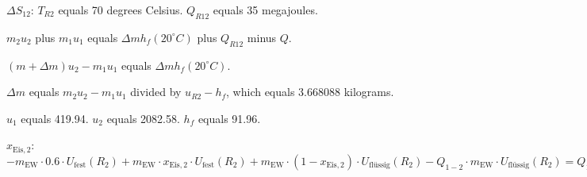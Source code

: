 \( \Delta S_{12} \): \( T_{R2} \) equals 70 degrees Celsius. \( Q_{R12} \) equals 35 megajoules.

\( m_2 u_2 \) plus \( m_1 u_1 \) equals \( \Delta m h_f (20^\circ C) \) plus \( Q_{R12} \) minus \( Q \).

\( (m + \Delta m) u_2 - m_1 u_1 \) equals \( \Delta m h_f (20^\circ C) \).

\( \Delta m \) equals \( m_2 u_2 - m_1 u_1 \) divided by \( u_{R2} - h_f \), which equals 3.668088 kilograms.

\( u_1 \) equals 419.94. \( u_2 \) equals 2082.58. \( h_f \) equals 91.96.

\( x_{\text{Eis},2} \):  
\( - m_{\text{EW}} \cdot 0.6 \cdot U_{\text{fest}}(R_2) + m_{\text{EW}} \cdot x_{\text{Eis},2} \cdot U_{\text{fest}}(R_2) + m_{\text{EW}} \cdot (1 - x_{\text{Eis},2}) \cdot U_{\text{flüssig}}(R_2) - Q_{1-2} \cdot m_{\text{EW}} \cdot U_{\text{flüssig}}(R_2) = Q_{1-2} - x \cdot 0 \)